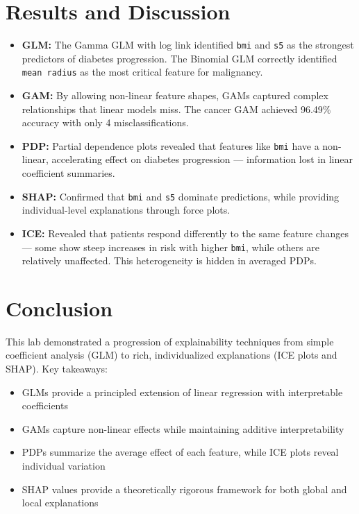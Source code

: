 \documentclass[12pt,a4paper]{article}
\begin{document}
\section{Results and Discussion}
\begin{itemize}
    \item \textbf{GLM:} The Gamma GLM with log link identified \texttt{bmi} and \texttt{s5} as the strongest predictors of diabetes progression. The Binomial GLM correctly identified \texttt{mean radius} as the most critical feature for malignancy.
    \item \textbf{GAM:} By allowing non-linear feature shapes, GAMs captured complex relationships that linear models miss. The cancer GAM achieved 96.49\% accuracy with only 4 misclassifications.
    \item \textbf{PDP:} Partial dependence plots revealed that features like \texttt{bmi} have a non-linear, accelerating effect on diabetes progression --- information lost in linear coefficient summaries.
    \item \textbf{SHAP:} Confirmed that \texttt{bmi} and \texttt{s5} dominate predictions, while providing individual-level explanations through force plots.
    \item \textbf{ICE:} Revealed that patients respond differently to the same feature changes --- some show steep increases in risk with higher \texttt{bmi}, while others are relatively unaffected. This heterogeneity is hidden in averaged PDPs.
\end{itemize}

\section{Conclusion}
This lab demonstrated a progression of explainability techniques from simple coefficient analysis (GLM) to rich, individualized explanations (ICE plots and SHAP). Key takeaways:
\begin{itemize}
    \item GLMs provide a principled extension of linear regression with interpretable coefficients
    \item GAMs capture non-linear effects while maintaining additive interpretability
    \item PDPs summarize the average effect of each feature, while ICE plots reveal individual variation
    \item SHAP values provide a theoretically rigorous framework for both global and local explanations
\end{itemize}
\end{document}
